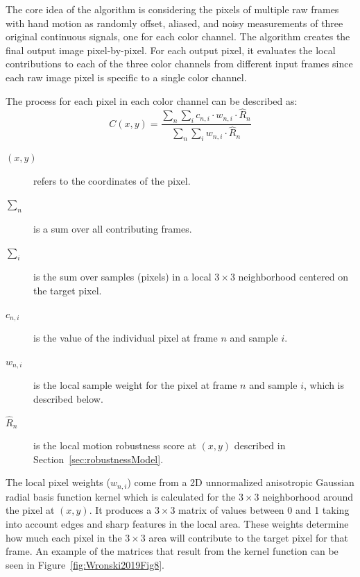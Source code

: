 \documentclass{sig-alternate}
\begin{document}
The core idea of the algorithm is considering the pixels of multiple raw frames with hand motion as randomly offset, aliased, and noisy measurements of three original continuous signals, one for each color channel. The algorithm creates the final output image pixel-by-pixel. For each output pixel, it evaluates the local contributions to each of the three color channels from different input frames since each raw image pixel is specific to a single color channel. 

The process for each pixel in each color channel can be described as:
\begin{equation*}
C(x, y)=\frac{\sum_{n} \sum_{i} c_{n, i} \cdot w_{n, i} \cdot \hat{R}_{n}}{\sum_{n} \sum_{i} w_{n, i} \cdot \hat{R}_{n}}
\end{equation*}


\begin{description}
  \item[$(x,y)$] refers to the coordinates of the pixel. 
  \item[$\sum_{n}$] is a sum over all contributing frames.
  \item[$\sum_{i}$] is the sum over samples (pixels) in a local $3\times 3$ neighborhood centered on the target pixel.
  \item[$c_{n, i}$] is the value of the individual pixel at frame $n$ and sample $i$.
  \item[$w_{n, i}$] is the local sample weight for the pixel at frame $n$ and sample $i$, which is described below. 
  \item[$\hat{R}_{n}$] is the local motion robustness score at $(x,y)$ described in Section~\ref{sec:robustnessModel}.
\end{description}





The local pixel weights ($w_{n, i}$) come from a 2D unnormalized anisotropic Gaussian radial basis function kernel which is calculated for the $3\times 3$ neighborhood around the pixel at $(x,y)$. It produces a $3\times 3$ matrix of values between 0 and 1 taking into account edges and sharp features in the local area. These weights determine how much each pixel in the $3\times 3$ area will contribute to the target pixel for that frame. An example of the matrices that result from the kernel function can be seen in Figure~\ref{fig:Wronski2019Fig8}.
\end{document}
